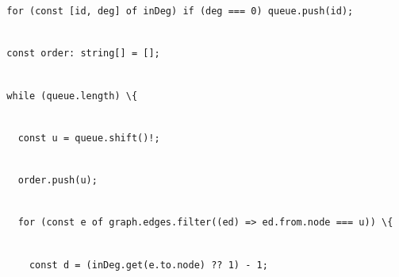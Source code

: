 \documentclass[
]{article}
\newcommand{\passthrough}[1]{#1}
\begin{document}
\passthrough{\lstinline!  !}\passthrough{\lstinline!for!}\passthrough{\lstinline! !}\passthrough{\lstinline!(const!}\passthrough{\lstinline! !}\passthrough{\lstinline![id,!}\passthrough{\lstinline! !}\passthrough{\lstinline!deg]!}\passthrough{\lstinline! !}\passthrough{\lstinline!of!}\passthrough{\lstinline! !}\passthrough{\lstinline!inDeg!}\passthrough{\lstinline!)!}\passthrough{\lstinline! !}\passthrough{\lstinline!if!}\passthrough{\lstinline! !}\passthrough{\lstinline!(deg!}\passthrough{\lstinline! !}\passthrough{\lstinline!===!}\passthrough{\lstinline! !}\passthrough{\lstinline!0)!}\passthrough{\lstinline! !}\passthrough{\lstinline!queue.push!}\passthrough{\lstinline!(id);!}\strut \\
\passthrough{\lstinline!  !}\passthrough{\lstinline!const!}\passthrough{\lstinline! !}\passthrough{\lstinline!order:!}\passthrough{\lstinline! !}\passthrough{\lstinline!string[]!}\passthrough{\lstinline! !}\passthrough{\lstinline!=!}\passthrough{\lstinline! !}\passthrough{\lstinline![];!}\strut \\
\passthrough{\lstinline!  !}\passthrough{\lstinline!while!}\passthrough{\lstinline! !}\passthrough{\lstinline!(!}\passthrough{\lstinline!queue.length!}\passthrough{\lstinline!)!}\passthrough{\lstinline! !}\passthrough{\lstinline!\{!}\strut \\
\passthrough{\lstinline!    !}\passthrough{\lstinline!const!}\passthrough{\lstinline! !}\passthrough{\lstinline!u!}\passthrough{\lstinline! !}\passthrough{\lstinline!=!}\passthrough{\lstinline! !}\passthrough{\lstinline!queue.shift!}\passthrough{\lstinline"()!;"}\strut \\
\passthrough{\lstinline!    !}\passthrough{\lstinline!order.push!}\passthrough{\lstinline!(u);!}\strut \\
\passthrough{\lstinline!    !}\passthrough{\lstinline!for!}\passthrough{\lstinline! !}\passthrough{\lstinline!(const!}\passthrough{\lstinline! !}\passthrough{\lstinline!e!}\passthrough{\lstinline! !}\passthrough{\lstinline!of!}\passthrough{\lstinline! !}\passthrough{\lstinline!graph.edges.filter!}\passthrough{\lstinline!((ed)!}\passthrough{\lstinline! !}\passthrough{\lstinline!=>!}\passthrough{\lstinline! !}\passthrough{\lstinline!ed.from.node!}\passthrough{\lstinline! !}\passthrough{\lstinline!===!}\passthrough{\lstinline! !}\passthrough{\lstinline!u))!}\passthrough{\lstinline! !}\passthrough{\lstinline!\{!}\strut \\
\passthrough{\lstinline!      !}\passthrough{\lstinline!const!}\passthrough{\lstinline! !}\passthrough{\lstinline!d!}\passthrough{\lstinline! !}\passthrough{\lstinline!=!}\passthrough{\lstinline! !}\passthrough{\lstinline!(!}\passthrough{\lstinline!inDeg.get!}\passthrough{\lstinline!(!}\passthrough{\lstinline!e.to.node!}\passthrough{\lstinline!)!}\passthrough{\lstinline! !}\passthrough{\lstinline!??!}\passthrough{\lstinline! !}\passthrough{\lstinline!1)!}\passthrough{\lstinline! !}\passthrough{\lstinline!-!}\passthrough{\lstinline! !}\passthrough{\lstinline!1;!}\strut \\
\end{document}
